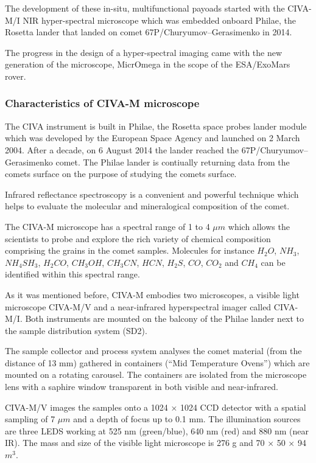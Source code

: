 The development of these in-situ, multifunctional payoads 
started with the CIVA-M/I NIR hyper-spectral microscope which was embedded onboard Philae, the Rosetta lander that landed on comet 67P/Churyumov–Gerasimenko in 2014.

The progress in the design of a hyper-spectral imaging came with the new generation of the microscope, MicrOmega in the scope of the ESA/ExoMars rover.
\cite{Pilorget201342}

\subsubsection{Characteristics of CIVA-M microscope \cite{Bibring2007}}


The CIVA instrument is built in Philae, the Rosetta space probes lander module which was developed by the European Space Agency and launched on 2 March 2004. After a decade, on 6 August 2014 the lander reached the 67P/Churyumov–Gerasimenko comet. The Philae lander is contiually returning data from the comets surface on the purpose of studying the comets surface.
\cite{wiki:Rosetta}


Infrared reflectance spectroscopy is a convenient and powerful technique which helps to evaluate the molecular and mineralogical composition of the comet.

The CIVA-M microscope has a spectral range of 1 to 4 $\mu m$ which allows the scientists to probe and explore the rich variety of chemical composition comprising the grains in the comet samples.
Molecules for instance $H_2O$, $NH_3$, $NH_4SH_3$, $H_2CO$, $CH_3OH$, $CH_3CN$, $HCN$, $H_2S$, $CO$, $CO_2$ and $CH_4$ can be identified within this spectral range.

As it was mentioned before, CIVA-M embodies two microscopes, a visible light microscope CIVA-M/V and a near-infrared hyperspectral imager called CIVA-M/I. Both instruments are mounted on the balcony of  the Philae lander next to the sample distribution system (SD2).

The sample collector and process system analyses the comet material (from the distance of 13 mm) gathered in containers (“Mid Temperature
Ovens”) which are mounted on a rotating carousel. The containers are isolated from the microscope lens with a saphire window transparent in both visible and near-infrared.

CIVA-M/V images the samples onto a 1024 × 1024 CCD detector with a spatial sampling of 7 $\mu m$ and a depth of focus up to 0.1 mm. The illumination sources are three LEDS working at 525 nm (green/blue), 640 nm (red) and 880 nm (near IR). The mass and size of the visible light microscope is 276 g and 70 × 50 × 94 $m^3$. 


